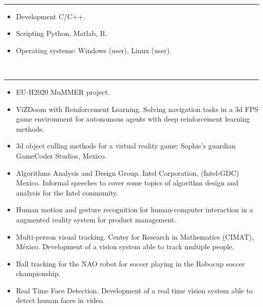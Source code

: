 \documentclass[10 pt]{article}
\newcommand{\mypartitle}[2][2.]{\vspace*{-#1 ex}~\\{\noindent {\bf #2}}}
\begin{document}
\medskip
\medskip

\mypartitle{Skills}
\medskip
\hrule
\medskip

\begin{itemize}[noitemsep]
\item Development C/C++.
\item Scripting Python,  Matlab, R.
\item Operating systems: Windows (user), Linux (user).
\end{itemize}

\medskip
\medskip


\mypartitle{Projects}
\medskip
\hrule
\medskip

\begin{itemize}[noitemsep]

\item EU-H2020 MuMMER project.%

\item ViZDoom with Reinforcement Learning. Solving navigation tasks in a 3d FPS game 
environment for autonomous agents with deep reinforcement learning methods.

\item 3d object culling methods for a virtual reality game: Sophie's guardian GameCoder Studios, Mexico.

\item Algorithms Analysis and Design Group. Intel Corporation, (Intel-GDC) Mexico. 
Informal speeches to cover some topics of algorithm design and analysis for the Intel community.

\item Human motion and gesture recognition for human-computer interaction in a augmented reality
system for product management.

\item Multi-person visual tracking. Center for Research in Mathematics (CIMAT), México. 
Development of a vision system able to track multiple people.

\item Ball tracking for the NAO robot for soccer playing in the Robocup soccer championship.

\item Real Time Face Detection. Development of a real time vision system able to detect human
faces in video.


\end{itemize}
\end{document}
